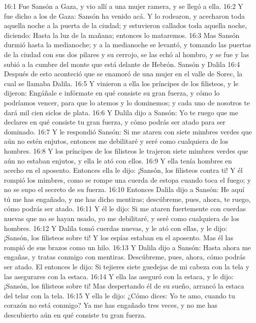 16:1 Fue Sansón a Gaza, y vio allí a una mujer ramera, y se llegó a ella.  
16:2 Y fue dicho a los de Gaza: Sansón ha venido acá. Y lo rodearon, y acecharon toda aquella noche a la puerta de la ciudad; y estuvieron callados toda aquella noche, diciendo: Hasta la luz de la mañana; entonces lo mataremos.  
16:3 Mas Sansón durmió hasta la medianoche; y a la medianoche se levantó, y tomando las puertas de la ciudad con sus dos pilares y su cerrojo, se las echó al hombro, y se fue y las subió a la cumbre del monte que está delante de Hebrón.  
Sansón y Dalila  
16:4 Después de esto aconteció que se enamoró de una mujer en el valle de Sorec, la cual se llamaba Dalila.  
16:5 Y vinieron a ella los príncipes de los filisteos, y le dijeron: Engáñale e infórmate en qué consiste su gran fuerza, y cómo lo podríamos vencer, para que lo atemos y lo dominemos; y cada uno de nosotros te dará mil cien siclos de plata.  
16:6 Y Dalila dijo a Sansón: Yo te ruego que me declares en qué consiste tu gran fuerza, y cómo podrás ser atado para ser dominado.  
16:7 Y le respondió Sansón: Si me ataren con siete mimbres verdes que aún no estén enjutos, entonces me debilitaré y seré como cualquiera de los hombres.  
16:8 Y los príncipes de los filisteos le trajeron siete mimbres verdes que aún no estaban enjutos, y ella le ató con ellos.  
16:9 Y ella tenía hombres en acecho en el aposento. Entonces ella le dijo: ¡Sansón, los filisteos contra ti! Y él rompió los mimbres, como se rompe una cuerda de estopa cuando toca el fuego; y no se supo el secreto de su fuerza.  
16:10 Entonces Dalila dijo a Sansón: He aquí tú me has engañado, y me has dicho mentiras; descúbreme, pues, ahora, te ruego, cómo podrás ser atado.  
16:11 Y él le dijo: Si me ataren fuertemente con cuerdas nuevas que no se hayan usado, yo me debilitaré, y seré como cualquiera de los hombres.  
16:12 Y Dalila tomó cuerdas nuevas, y le ató con ellas, y le dijo: ¡Sansón, los filisteos sobre ti! Y los espías estaban en el aposento. Mas él las rompió de sus brazos como un hilo.  
16:13 Y Dalila dijo a Sansón: Hasta ahora me engañas, y tratas conmigo con mentiras. Descúbreme, pues, ahora, cómo podrás ser atado. El entonces le dijo: Si tejieres siete guedejas de mi cabeza con la tela y las asegurares con la estaca.  
16:14 Y ella las aseguró con la estaca, y le dijo: ¡Sansón, los filisteos sobre ti! Mas despertando él de su sueño, arrancó la estaca del telar con la tela.  
16:15 Y ella le dijo: ¿Cómo dices: Yo te amo, cuando tu corazón no está conmigo? Ya me has engañado tres veces, y no me has descubierto aún en qué consiste tu gran fuerza.  

